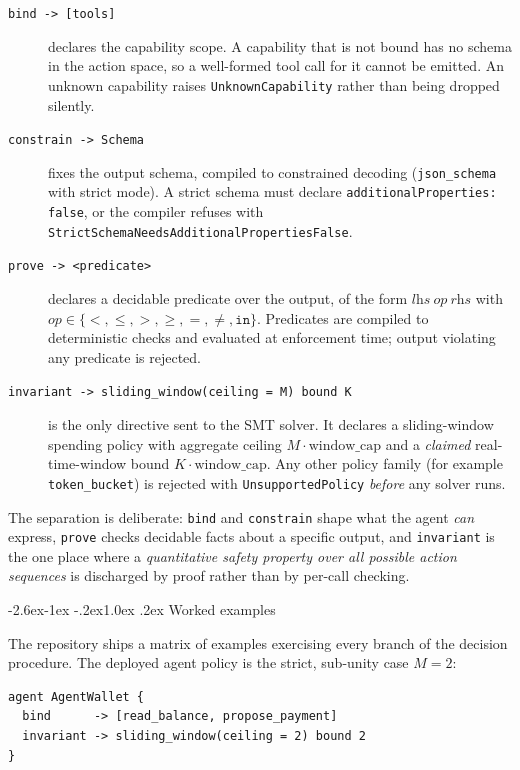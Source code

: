 \documentclass[11pt]{article}
\makeatletter
\renewcommand\subsection{\@startsection{subsection}{2}{\z@}%
  {-2.6ex\@plus -1ex \@minus -.2ex}{1.0ex \@plus .2ex}%
  {\normalfont\sffamily\large\bfseries}}
\theoremstyle{plain}
\theoremstyle{definition}
\theoremstyle{remark}
\makeatother
\begin{document}
\begin{description}
\item[\texttt{bind -> [tools]}] declares the capability scope. A capability
  that is not bound has no schema in the action space, so a well-formed tool
  call for it cannot be emitted. An unknown capability raises
  \texttt{UnknownCapability} rather than being dropped silently.
\item[\texttt{constrain -> Schema}] fixes the output schema, compiled to
  constrained decoding (\texttt{json\_schema} with strict mode). A strict
  schema must declare \texttt{additionalProperties: false}, or the compiler
  refuses with \texttt{StrictSchemaNeedsAdditionalPropertiesFalse}.
\item[\texttt{prove -> <predicate>}] declares a decidable predicate over the
  output, of the form $\textit{lhs}\ \textit{op}\ \textit{rhs}$ with
  $\textit{op}\in\{<,\le,>,\ge,=,\ne,\texttt{in}\}$. Predicates are compiled to
  deterministic checks and evaluated at enforcement time; output violating any
  predicate is rejected.
\item[\texttt{invariant -> sliding\_window(ceiling = M) bound K}] is the only
  directive sent to the SMT solver. It declares a sliding-window spending
  policy with aggregate ceiling $M\cdot\text{window\_cap}$ and a
  \emph{claimed} real-time-window bound $K\cdot\text{window\_cap}$. Any other
  policy family (for example \texttt{token\_bucket}) is rejected with
  \texttt{UnsupportedPolicy} \emph{before} any solver runs.
\end{description}

\noindent The separation is deliberate: \texttt{bind} and \texttt{constrain}
shape what the agent \emph{can} express, \texttt{prove} checks decidable facts
about a specific output, and \texttt{invariant} is the one place where a
\emph{quantitative safety property over all possible action sequences} is
discharged by proof rather than by per-call checking.

\subsection{Worked examples}

The repository ships a matrix of examples exercising every branch of the
decision procedure. The deployed agent policy is the strict, sub-unity case
$M=2$:

\begin{lstlisting}
agent AgentWallet {
  bind      -> [read_balance, propose_payment]
  invariant -> sliding_window(ceiling = 2) bound 2
}
\end{lstlisting}
\end{document}
